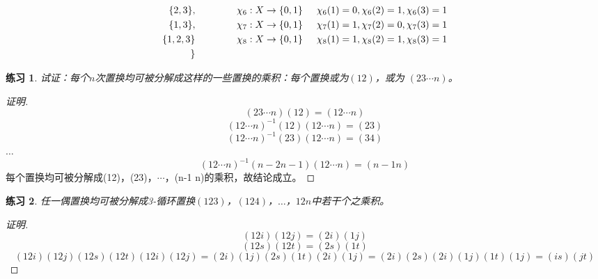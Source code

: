 \documentclass{book}[oneside]
\newtheorem{Exercise}{练习}[chapter]
\begin{document}
\begin{CJK*}{UTF8}{gbsn}
\begin{align*}
    \{2,3\},&\hspace{1.5cm}\chi_6:X\to \{0,1\}\hspace{0.5cm} \chi_6(1)=0,\chi_6(2)=1,\chi_6(3)=1\\
    \{1,3\},&\hspace{1.5cm}\chi_7:X\to \{0,1\}\hspace{0.5cm} \chi_7(1)=1,\chi_7(2)=0,\chi_7(3)=1\\
    \{1,2,3\}&\hspace{1.5cm}\chi_8:X\to \{0,1\}\hspace{0.5cm} \chi_8(1)=1,\chi_8(2)=1,\chi_8(3)=1\\
    \}\\
  \end{align*}

  \begin{Exercise}
    试证：每个$n$次置换均可被分解成这样的一些置换的乘积：每个置换或为$(12)$，或为
    $(23\cdots n)$。  
    \end{Exercise}
    \begin{proof}[证明]
      \[(23\cdots n)(12) = (12\cdots n)\]
      \[(12\cdots n)^{-1}(12)(12\cdots n) = (23)\]
      \[(12\cdots n)^{-1}(23)(12\cdots n) = (34)\]
      $\ldots$
      \[(12\cdots n)^{-1}(n-2 n-1)(12\cdots n) = (n-1 n)\]
      每个置换均可被分解成(12)，(23)，$\cdots$，(n-1 n)的乘积，故结论成立。
    \end{proof}

    \begin{Exercise}
      任一偶置换均可被分解成3-循环置换$(123)$，$(124)$，$\ldots$，$12n$中若干个之乘积。 
      \end{Exercise}
      \begin{proof}[证明]
        \[(12i)(12j)=(2i)(1j)\]
        \[(12s)(12t)=(2s)(1t)\]
        \[(12i)(12j)(12s)(12t)(12i)(12j)=(2i)(1j)(2s)(1t)(2i)(1j)=(2i)(2s)(2i)(1j)(1t)(1j)=(is)(jt)\]
      \end{proof}
    
  
  
\chapter{}

\end{CJK*}
\end{document}
